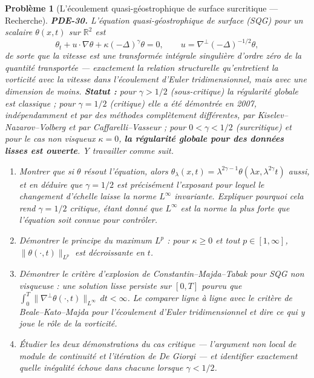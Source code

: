 \documentclass[11pt]{article}
\newtheorem{problem}{Problème}
\begin{document}
\begin{problem}[{L'écoulement quasi-géostrophique de surface surcritique --- Recherche}]
\textbf{PDE-30.} L'équation quasi-géostrophique de surface (SQG) pour un scalaire
$\theta(x,t)$ sur $\mathbb{R}^2$ est
\[ \theta_t + u\cdot\nabla\theta + \kappa(-\Delta)^{\gamma}\theta = 0, \qquad
u = \nabla^{\perp}(-\Delta)^{-1/2}\theta, \]
de sorte que la vitesse est une transformée intégrale singulière d'ordre zéro de la quantité
transportée --- exactement la relation structurelle qu'entretient la vorticité avec la vitesse dans
l'écoulement d'Euler tridimensionnel, mais avec une dimension de moins.
\textbf{Statut :} pour $\gamma > 1/2$ (sous-critique) la régularité globale est classique ;
pour $\gamma = 1/2$ (critique) elle a été démontrée en 2007, indépendamment et par des méthodes
complètement différentes, par Kiselev--Nazarov--Volberg et par
Caffarelli--Vasseur ; pour $0 < \gamma < 1/2$ (surcritique) et pour le cas non visqueux
$\kappa = 0$, \textbf{la régularité globale pour des données lisses est ouverte}. Y travailler
comme suit.
\begin{enumerate}
\item[(a)] Montrer que si $\theta$ résout l'équation, alors
$\theta_\lambda(x,t) = \lambda^{2\gamma-1}\theta(\lambda x, \lambda^{2\gamma}t)$ aussi,
et en déduire que $\gamma = 1/2$ est précisément l'exposant pour lequel le changement d'échelle
laisse la norme $L^\infty$ invariante. Expliquer pourquoi cela rend $\gamma = 1/2$
critique, étant donné que $L^\infty$ est la norme la plus forte que l'équation soit connue pour
contrôler.
\item[(b)] Démontrer le principe du maximum $L^p$ : pour $\kappa \ge 0$ et tout
$p \in [1,\infty]$, $\|\theta(\cdot,t)\|_{L^p}$ est décroissante en $t$.
\item[(c)] Démontrer le critère d'explosion de Constantin--Majda--Tabak pour SQG non visqueuse : une
solution lisse persiste sur $[0,T]$ pourvu que
$\int_0^T \|\nabla^{\perp}\theta(\cdot,t)\|_{L^\infty}\,dt < \infty$. Le comparer
ligne à ligne avec le critère de Beale--Kato--Majda pour l'écoulement d'Euler tridimensionnel
et dire ce qui y joue le rôle de la vorticité.
\item[(d)] Étudier les deux démonstrations du cas critique --- l'argument non local de module de
continuité et l'itération de De Giorgi --- et identifier exactement
quelle inégalité échoue dans chacune lorsque $\gamma < 1/2$.
\end{enumerate}

\end{problem}
\end{document}
